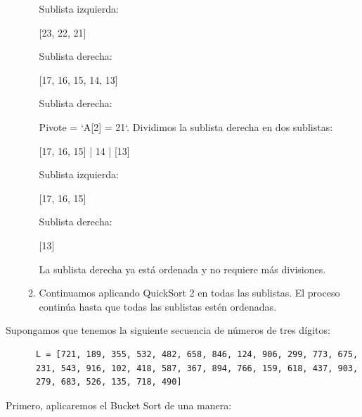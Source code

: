 \documentclass[answers, 11pt]{exam}
\begin{document}
\begin{questions}
\begin{solution}
\begin{itemize}
\begin{enumerate}
    Sublista izquierda:
    
    [23, 22, 21]
    
    Sublista derecha:
    
    [17, 16, 15, 14, 13]
    
    Sublista derecha:

    Pivote = `A[2] = 21`. Dividimos la sublista derecha en dos sublistas:

    [17, 16, 15] | 14 | [13]
    
    Sublista izquierda:
    
    [17, 16, 15]
    
    Sublista derecha:

    [13]
    
    La sublista derecha ya está ordenada y no requiere más divisiones.

 \item Continuamos aplicando QuickSort 2 en todas las sublistas. El proceso continúa hasta que todas las sublistas estén ordenadas.
  \end{enumerate}

\end{itemize}

\end{solution}


\begin{solution}
  Supongamos que tenemos la siguiente secuencia de números de tres dígitos:
    \begin{verbatim}
      L = [721, 189, 355, 532, 482, 658, 846, 124, 906, 299, 773, 675, 
      231, 543, 916, 102, 418, 587, 367, 894, 766, 159, 618, 437, 903, 
      279, 683, 526, 135, 718, 490]  
    \end{verbatim}
  Primero, aplicaremos el Bucket Sort de una manera:


\end{solution}
\end{questions}
\end{document}
